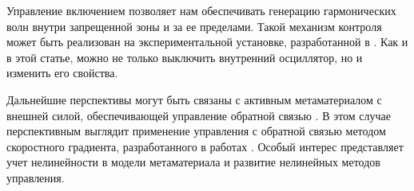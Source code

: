 Управление включением позволяет нам обеспечивать генерацию гармонических волн внутри запрещенной зоны и за ее пределами. Такой механизм контроля может быть реализован на экспериментальной установке, разработанной в \cite{Yang}. Как и в этой статье, можно не только выключить внутренний осциллятор, но и изменить его свойства.

Дальнейшие перспективы могут быть связаны с активным метаматериалом с внешней силой, обеспечивающей управление обратной связью \cite {Pope2012, Pope2014}. В этом случае перспективным выглядит применение управления с обратной связью методом скоростного градиента, разработанного в работах \cite {Fradkov2007, Porubov et al.2016}. Особый интерес представляет учет нелинейности в модели метаматериала и развитие нелинейных методов управления.